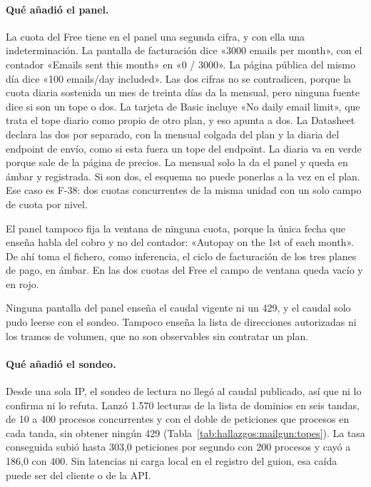 \paragraph{Qué añadió el panel.} La cuota del Free tiene en el panel una segunda cifra, y con ella una indeterminación. La pantalla de facturación dice «3000
emails per month», con el contador «Emails sent this month» en «0 / 3000». La
página pública del mismo día dice «100 emails/day included». Las dos cifras no
se contradicen, porque la cuota diaria sostenida un mes de treinta días da la
mensual, pero ninguna fuente dice si son un tope o dos. La tarjeta de Basic incluye «No daily
email limit», que trata el tope diario como propio de otro plan, y eso apunta a
dos. La Datasheet declara las dos por separado, con la mensual
colgada del plan y la diaria del endpoint de envío, como si esta fuera un tope
del endpoint.
La diaria va en verde porque sale de la página de precios.
La mensual solo la da el panel y queda en ámbar y registrada.
Si son dos, el esquema no puede ponerlas a la vez en el plan. Ese
caso es F-38: dos cuotas concurrentes de la misma unidad con un solo campo de
cuota por nivel.

El panel tampoco fija la ventana de ninguna cuota, porque la única fecha que
enseña habla del cobro y no del contador: «Autopay on the 1st of each month». De
ahí toma el fichero, como inferencia, el ciclo de facturación de los tres planes
de pago, en ámbar. En las dos cuotas del Free el campo de ventana queda vacío y en rojo.

Ninguna pantalla del panel enseña el caudal vigente ni un 429, y el caudal solo pudo leerse con el sondeo. Tampoco enseña la lista de direcciones autorizadas ni los tramos de volumen, que no son observables sin contratar un plan.

\paragraph{Qué añadió el sondeo.} Desde una sola IP, el sondeo de lectura no
llegó al caudal publicado, así que ni lo confirma ni lo refuta. Lanzó 1.570
lecturas de la lista de dominios en seis tandas, de 10 a 400 procesos
concurrentes y con el doble de peticiones que procesos en cada tanda, sin obtener ningún 429 (Tabla~\ref{tab:hallazgos:mailgun:topes}). La tasa conseguida subió hasta 303,0 peticiones por segundo
con 200 procesos y cayó a 186,0 con 400. Sin latencias ni carga local en el registro del guion, esa caída puede ser del cliente o de la API.

